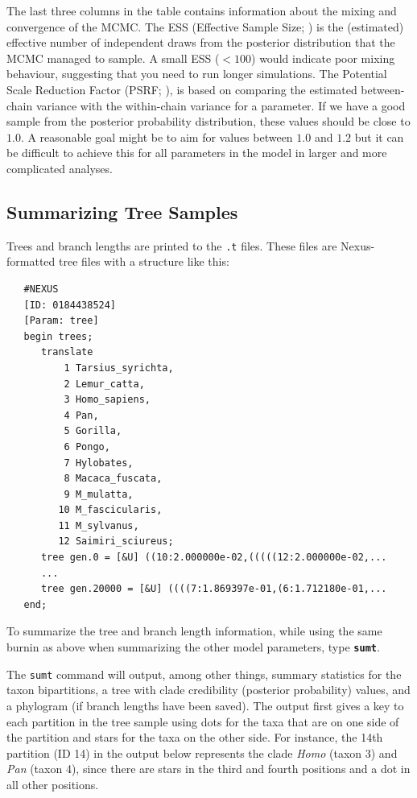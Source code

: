 \documentclass[12pt]{book}
\newcommand{\ttt}[1]{\texttt{#1}}
\newcommand{\tb}[1]{\ttt{\textbf{#1}}}
\begin{document}
The last three columns in the table contains information about the mixing and convergence of the
MCMC. The ESS (Effective Sample Size; \cite{ripley87}) is the (estimated) effective number of
independent draws from the posterior distribution that the MCMC managed to sample. A small ESS
($<100$) would indicate poor mixing behaviour, suggesting that you need to run longer simulations.
The Potential Scale Reduction Factor (PSRF; \cite{gelman92}), is based on comparing the estimated
between-chain variance with the within-chain variance for a parameter. If we have a good sample
from the posterior probability distribution, these values should be close to $1.0$. A reasonable
goal might be to aim for values between $1.0$ and $1.2$ but it can be difficult to achieve this
for all parameters in the model in larger and more complicated analyses.

\subsection{Summarizing Tree Samples}

Trees and branch lengths are printed to the \ttt{.t} files. These files are Nexus-formatted tree
files with a structure like this:

\begin{singlespacing}
\footnotesize
\begin{verbatim}
   #NEXUS
   [ID: 0184438524]
   [Param: tree]
   begin trees;
      translate
          1 Tarsius_syrichta,
          2 Lemur_catta,
          3 Homo_sapiens,
          4 Pan,
          5 Gorilla,
          6 Pongo,
          7 Hylobates,
          8 Macaca_fuscata,
          9 M_mulatta,
         10 M_fascicularis,
         11 M_sylvanus,
         12 Saimiri_sciureus;
      tree gen.0 = [&U] ((10:2.000000e-02,(((((12:2.000000e-02,...
      ...
      tree gen.20000 = [&U] ((((7:1.869397e-01,(6:1.712180e-01,...
   end;
\end{verbatim}
\normalsize
\end{singlespacing}

To summarize the tree and branch length information, while using the same burnin as above when
summarizing the other model parameters, type \tb{sumt}.

The \ttt{sumt} command will output, among other things, summary statistics for the taxon
bipartitions, a tree with clade credibility (posterior probability) values, and a phylogram (if
branch lengths have been saved). The output first gives a key to each partition in the tree sample
using dots for the taxa that are on one side of the partition and stars for the taxa on the other
side. For instance, the 14th partition (ID 14) in the output below represents the clade
\textit{Homo} (taxon 3) and \textit{Pan} (taxon 4), since there are stars in the third and fourth
positions and a dot in all other positions.
\end{document}
